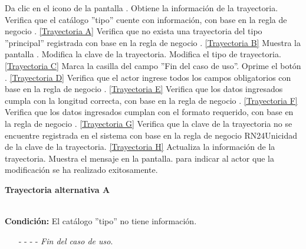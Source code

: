 	\begin{UCtrayectoria}
		\UCpaso[\UCactor] Da clic en el icono \editar de la pantalla .
		\UCpaso[\UCsist] Obtiene la información de la trayectoria.
		\UCpaso[\UCsist] Verifica que el catálogo ''tipo'' cuente con información, con base en la regla de negocio . \hyperlink{CU12-1-1-2:TAA}{[Trayectoria A]}
		\UCpaso[\UCsist] Verifica que no exista una trayectoria del tipo ''principal'' registrada con base en la regla de negocio . \hyperlink{CU12-1-1-2:TAB}{[Trayectoria B]}
		\UCpaso[\UCsist] Muestra la pantalla .\label{CU12.1.1.2-P14}
		\UCpaso[\UCactor] Modifica la clave de la trayectoria. \label{CU12.1.1.2-P15}
		\UCpaso[\UCactor] Modifica el tipo de trayectoria. \hyperlink{CU12-1-1-2:TAC}{[Trayectoria C]} \label{CU12.1.1.2-P16}
		\UCpaso[\UCsist] Marca la casilla del campo ''Fin del caso de uso''. 
		\UCpaso[\UCactor] Oprime el botón . \hyperlink{CU12-1-1-2:TAD}{[Trayectoria D]} \label{CU12.1.1.2-P18}
		\UCpaso[\UCsist] Verifica que el actor ingrese todos los campos obligatorios con base en la regla de negocio . \hyperlink{CU12-1-1-2:TAE}{[Trayectoria E]}
		\UCpaso[\UCsist] Verifica que los datos ingresados cumpla con la longitud correcta, con base en la regla de negocio . \hyperlink{CU12-1-1-2:TAF}{[Trayectoria F]}
		\UCpaso[\UCsist] Verifica que los datos ingresados cumplan con el formato requerido, con base en la regla de negocio . \hyperlink{CU12-1-1-2:TAG}{[Trayectoria G]}
		\UCpaso[\UCsist] Verifica que la clave de la trayectoria no se encuentre registrada en el sistema con base en la regla de negocio {RN24}{Unicidad de la clave de la trayectoria}. \hyperlink{CU12-1-1-2:TAH}{[Trayectoria H]}
		\UCpaso[\UCsist] Actualiza la información de la trayectoria.
		\UCpaso[\UCsist] Muestra el mensaje  en la pantalla.  para indicar al actor que la modificación se ha realizado exitosamente.
	\end{UCtrayectoria}		
\hypertarget{CU12-1-1-2:TAA}{\textbf{Trayectoria alternativa A}}\\
\noindent \textbf{Condición:} El catálogo ''tipo'' no tiene información.
\begin{enumerate}
	\UCpaso[\UCsist] Muestra el mensaje  en la pantalla  para indicar que no es posible realizar la operación debido a la falta de información necesaria para el sistema.
	\item[- -] - - {\em {Fin del caso de uso}}.%
\end{enumerate}
